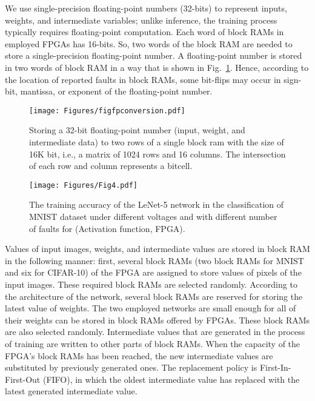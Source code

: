 \documentclass[conference]{IEEEtran}
\begin{document}
  We use single-precision floating-point numbers (32-bits) to represent inputs, weights, and intermediate variables; unlike inference, the training process typically requires floating-point computation. Each word of block RAMs in employed FPGAs has 16-bits. So, two words of the block RAM are needed to store a single-precision floating-point number.
 A floating-point number is stored in two words of block RAM in a way that is shown in Fig.~\ref{fig:fpconversion}. \color{black} Hence, according to the location of reported faults in block RAMs, some bit-flips may occur in sign-bit, mantissa, or exponent of the floating-point number.  
 \color{black}



\begin{figure}[!t]
\centerline{    \texttt{[image: Figures/figfpconversion.pdf]}}
\caption{Storing a 32-bit floating-point number (input, weight, and intermediate data) to two rows of a single block ram with the size of 16K bit, i.e., a matrix of 1024 rows and 16 columns. The intersection of each row and column represents a bitcell.}
\label{fig:fpconversion}
\end{figure}

 \begin{figure*}[t]
 \centering
\centerline{    \texttt{[image: Figures/Fig4.pdf]}}
\caption{The training accuracy of the LeNet-5 network in the classification of MNIST dataset under different voltages and with different number of faults  for (Activation function, FPGA).}
\label{fig:mnistacc}
\end{figure*}
  Values of input images, weights, and intermediate values are stored in block RAM in the following manner: first, several block RAMs (two block RAMs for MNIST and six for CIFAR-10) of the FPGA are assigned to store values of pixels of the input images. These required block RAMs are selected randomly. According to the architecture of the network, several block RAMs are reserved for storing the latest value of weights. The two employed networks are small enough for all of their weights can be stored in block RAMs offered by FPGAs. These block RAMs are also selected randomly.
  Intermediate values that are generated in the process of training are written to other parts of block RAMs.
  When the capacity of \color{black} the FPGA's block RAMs has \color{black} been reached, the new intermediate values are substituted by previously generated ones. The replacement policy is First-In-First-Out (FIFO), in which the oldest intermediate value has replaced with the latest generated intermediate value. 
 
\end{document}
